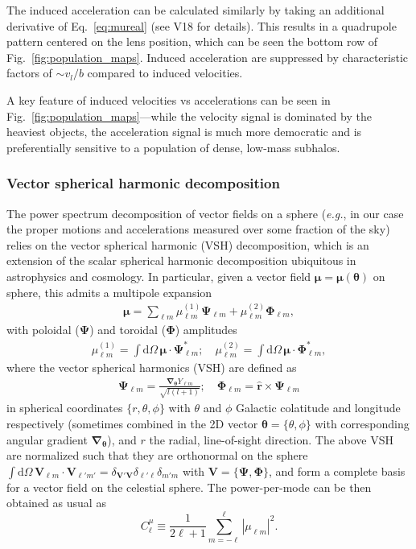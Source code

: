 \documentclass[prd,aps,10pt,nofootinbib,twocolumn,superscriptaddress,preprintnumbers,balancelastpage,longbibliography]{revtex4-1}
\newcommand{\vect}[1]{\boldsymbol{\mathbf{#1}}}
\newcommand{\dd}{\mathrm{d}}
\begin{document}
The induced acceleration can be calculated similarly by taking an additional derivative of Eq.~\ref{eq:mureal} (see V18 for details). This results in a quadrupole pattern centered on the lens position, which can be seen the bottom row of Fig.~\ref{fig:population_maps}. Induced acceleration are suppressed by characteristic factors of $\sim v_l/b$ compared to induced velocities. 

A key feature of induced velocities vs accelerations can be seen in Fig.~\ref{fig:population_maps}---while the velocity signal is dominated by the heaviest objects, the acceleration signal is much more democratic and is preferentially sensitive to a population of dense, low-mass subhalos.

\subsubsection*{Vector spherical harmonic decomposition}

The power spectrum decomposition of vector fields on a sphere (\emph{e.g.}, in our case the proper motions and accelerations measured over some fraction of the sky) relies on the vector spherical harmonic (VSH) decomposition, which is an extension of the scalar spherical harmonic decomposition ubiquitous in astrophysics and cosmology. In particular, given a vector field $\vect \mu = \vect \mu(\vect \theta)$ on sphere, this admits a multipole expansion
\begin{align}
\vect{\mu} = \sum_{\ell m} \mu^{(1)}_{\ell m} \vect{\Psi}_{\ell m} + \mu^{(2)}_{\ell m} \vect{\Phi}_{\ell m},
\label{eq:vsh_decomposition}
\end{align}
with poloidal ($\vect{\Psi}$) and toroidal ($\vect{\Phi}$) amplitudes 
\begin{align}
\mu^{(1)}_{\ell m} =  \int \dd \Omega \, \vect{\mu} \cdot \vect{\Psi}^*_{\ell m};\quad
 \mu^{(2)}_{\ell m} =  \int \dd \Omega \, \vect{\mu} \cdot \vect{\Phi}^*_{\ell m},
 \label{eq:harmdecomposition}
\end{align}
where the vector spherical harmonics (VSH) are defined as
\begin{align}
\vect{\Psi}_{\ell m} = \frac{\vect{\nabla}_{\vect{\theta}} Y_{\ell m}}{\sqrt{l(l+1)}}; \quad \vect{\Phi}_{\ell m} = \hat{\vect{r}} \times 
\vect{\Psi}_{\ell m} \label{eq:PsiPhidef}
\end{align}
in spherical coordinates $\lbrace r, \theta, \phi \rbrace$ with $\theta$ and $\phi$ Galactic colatitude and longitude respectively (sometimes combined in the 2D vector $\vect{\theta} = \lbrace \theta, \phi \rbrace$ with corresponding angular gradient $\vect{\nabla}_{\vect{\theta}}$), and $r$ the radial, line-of-sight direction. The above VSH are normalized such that they are orthonormal on the sphere $\int \dd \Omega \, \vect{V}_{\ell m} \cdot \vect{V}_{\ell' m'}  = \delta_{\vect{V}'\vect{V}} \delta_{\ell' \ell} \delta_{m' m}$ with $\vect{V} = \{\vect{\Psi},\vect{\Phi}\}$, and form a complete basis for a vector field on the celestial sphere. The power-per-mode can be then obtained as usual as 
\begin{equation}
C_{\ell}^{\mu} \equiv \frac{1}{2\ell + 1} \sum_{m = -\ell}^{\ell} \left| \mu_{\ell m} \right|^2.
\end{equation}
\end{document}
